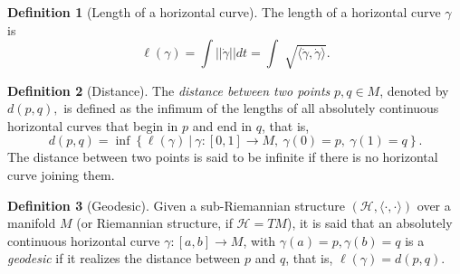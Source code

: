 \documentclass [xcolor=svgnames, t] {beamer}
\theoremstyle{definition}
\newtheorem{df}{Definition}
\theoremstyle{plain}
\theoremstyle{remark}
\begin{document}
\begin{frame}
\begin{df}[Length of a horizontal curve]
	The length of a horizontal curve $ \gamma $ is	
	$$ \ell(\gamma)= \int || \dot{\gamma}|| dt = \int \sqrt[]{ \langle \dot{\gamma},\dot{\gamma} \rangle}.  $$ 
\end{df}
\begin{df}[Distance]\label{df:horizontal_distance}
	The \textit{distance between two points} $ p,q\in M $, denoted by $ d(p,q), $   is defined as the infimum of the lengths of all absolutely continuous horizontal curves that begin in $ p $ and end in $ q $, that is, 
$$ d(p,q) = \operatorname{inf} \left\{ \ell(\gamma) \ |\ \gamma:[0,1] \rightarrow {M},\ \gamma(0)=p, \ \gamma(1)=q \right\}. $$ 
The distance between two points is said to be infinite if there is no horizontal curve joining them.
\end{df}
\begin{df}[Geodesic]
	Given a sub-Riemannian structure $ (\mathcal{H}, \langle\cdot,\cdot\rangle) $ over a manifold $ M $  (or Riemannian structure, if $ \mathcal{H}=TM $), it is said that an absolutely continuous horizontal curve $ \gamma:  [a,b] \rightarrow M$, with $ \gamma(a)=p, \gamma(b)=q $ is a \textit{geodesic} if it realizes the distance between $ p $ and $ q $, that is,   
	$ \ell(\gamma)= d(p,q). $ 
\end{df}
\end{frame}
\end{document}
